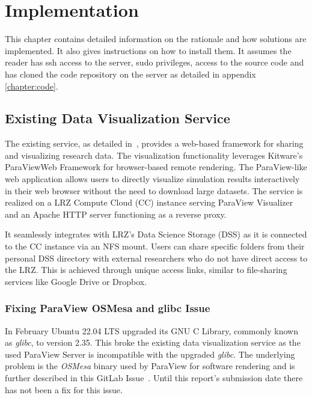 \chapter{Implementation}\label{chapter:implementation}

This chapter contains detailed information on the rationale and how solutions
are implemented. It also gives instructions on how to install them. It assumes
the reader has ssh access to the server, sudo privileges, access to the source
code and has cloned the code repository on the server as detailed in appendix
\ref{chapter:code}.

\section{Existing Data Visualization Service}

The existing service, as detailed in~\cite{nowak2024pvw}, provides a web-based
framework for sharing and visualizing research data. The visualization
functionality leverages Kitware's ParaViewWeb Framework for browser-based remote
rendering. The ParaView-like web application allows users to directly visualize
simulation results interactively in their web browser without the need to
download large datasets. The service is realized on a LRZ Compute Cloud (CC)
instance serving ParaView Visualizer and an Apache HTTP server functioning as a
reverse proxy.

It seamlessly integrates with LRZ's Data Science Storage (DSS) as it is
connected to the CC instance via an NFS mount. Users can share specific folders
from their personal DSS directory with external researchers who do not have
direct access to the LRZ. This is achieved through unique access links, similar
to file-sharing services like Google Drive or Dropbox.

\subsection{Fixing ParaView OSMesa and glibc Issue}

In February Ubuntu 22.04 LTS upgraded its GNU C Library, commonly known as
\textit{glibc}, to version 2.35. This broke the existing data visualization
service as the used ParaView Server is incompatible with the upgraded
\textit{glibc}. The underlying problem is the \textit{OSMesa} binary used by
ParaView for software rendering and is further described in this GitLab
Issue~\cite{kitwareOsmesaBinary}. Until this report's submission date there has
not been a fix for this issue.

